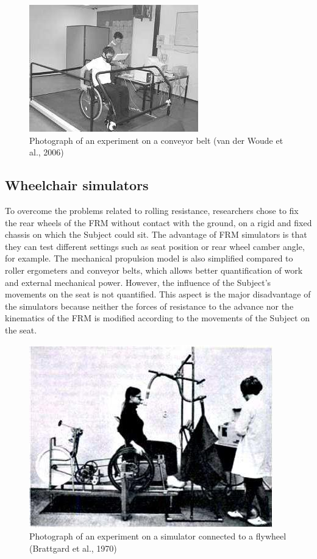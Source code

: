 \begin{figure}[h]
\center
\includegraphics[scale = 40]{images/tapi_roulant}
\caption{Photograph of an experiment on a conveyor belt (van der Woude et al., 2006)}
\label{tapi_roulant}
\end{figure}

\subsection{Wheelchair simulators}
To overcome the problems related to rolling resistance, researchers chose to fix the rear wheels of the FRM without contact with the ground, on a rigid and fixed chassis on which the Subject could sit. The advantage of FRM simulators is that they can test different settings such as seat position or rear wheel camber angle, for example. The mechanical propulsion model is also simplified compared to roller ergometers and conveyor belts, which allows better quantification of work and external mechanical power.   However, the influence of the Subject's movements on the seat is not quantified. This aspect is the major disadvantage of the simulators because neither the forces of resistance to the advance nor the kinematics of the FRM is modified according to the movements of the Subject on the seat.

\begin{figure}[h]
\center
\includegraphics[scale = 30]{images/SFR}
\caption{Photograph of an experiment on a simulator connected to a flywheel (Brattgard et al., 1970)}
\label{SFR}
\end{figure}

